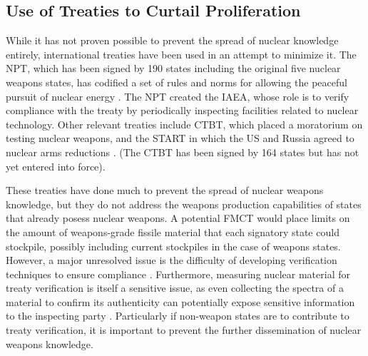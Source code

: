 \subsection{Use of Treaties to Curtail Proliferation}

While it has not proven possible to prevent the spread of nuclear knowledge entirely, international treaties have been used in an attempt to minimize it.  The \gls{NPT}, which has been signed by 190 states including the original five nuclear weapons states, has codified a set of rules and norms for allowing the peaceful pursuit of nuclear energy \cite{_treaty_????}.  The \gls{NPT} created the \gls{IAEA}, whose role is to verify compliance with the treaty by periodically inspecting facilities related to nuclear technology.  Other relevant treaties include \gls{CTBT}, which placed a moratorium on testing nuclear weapons, and the \gls{START} in which the \gls{US} and Russia agreed to nuclear arms reductions \cite{_treaty:_????, department_of_State_new_2010}. (The \gls{CTBT} has been signed by 164 states but has not yet entered into force).

These treaties have done much to prevent the spread of nuclear weapons knowledge, but they do not address the weapons production capabilities of states that already posess nuclear weapons.
A potential \gls{FMCT} would place limits on the amount of weapons-grade fissile material that each signatory state could stockpile, possibly including current stockpiles in the case of weapons states.  However, a major unresolved issue is the difficulty of developing verification techniques to ensure compliance \cite{_fissile_2013}.  Furthermore, measuring nuclear material for treaty verification is itself a sensitive issue, as even collecting the spectra of a material to confirm its authenticity can potentially expose sensitive information to the inspecting party \cite{glaser_zero-knowledge_2014}. Particularly if non-weapon states are to contribute to treaty verification, it is important to prevent the further dissemination of nuclear weapons knowledge.

